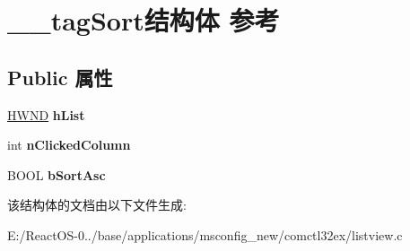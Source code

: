 \hypertarget{struct____tag_sort}{}\section{\+\_\+\+\_\+tag\+Sort结构体 参考}
\label{struct____tag_sort}
\subsection*{Public 属性}
\begin{DoxyCompactItemize}
\item 
\mbox{\label{struct____tag_sort_aa9ee9e0cb3a85edda315affe90731898}} 
\hyperlink{interfacevoid}{H\+W\+ND} {\bfseries h\+List}
\item 
\mbox{\label{struct____tag_sort_a61ae5a1e8cd6fc1ba523e554145803d8}} 
int {\bfseries n\+Clicked\+Column}
\item 
\mbox{\label{struct____tag_sort_ae27df3df39381f0b45c033d250db2b4f}} 
B\+O\+OL {\bfseries b\+Sort\+Asc}
\end{DoxyCompactItemize}


该结构体的文档由以下文件生成\+:\begin{DoxyCompactItemize}
\item 
E\+:/\+React\+O\+S-\/0../base/applications/msconfig\+\_\+new/comctl32ex/listview.\+c\end{DoxyCompactItemize}
